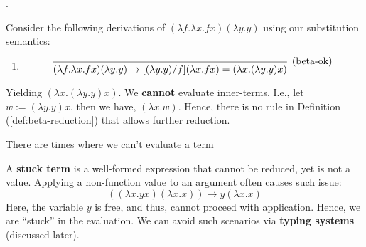     .
\begin{Example}

    \noindent
    Consider the following derivations of $(\lambda f. \lambda x. fx)(\lambda y. y)$ using our substitution semantics:

    \begin{enumerate}
        \item \[
        \begin{prooftree}
        \Infer0[(beta-ok)]{(\lambda f. \lambda x. fx)(\lambda y. y) \rightarrow [(\lambda y. y)/f](\lambda x. fx)=(\lambda x. (\lambda y. y)x)}
        \end{prooftree}
        \]
    \end{enumerate}
    \noindent
    Yielding $(\lambda x. (\lambda y. y)x)$. We \textbf{cannot} evaluate inner-terms. I.e., let $w:=(\lambda y.y)x$, then we have, $(\lambda x.w)$. Hence,
    there is no rule in Definition (\ref{def:beta-reduction}) that allows further reduction.
\end{Example}

\newpage

\noindent
There are times where we can't evaluate a term
\begin{Def}

    A \textbf{stuck term} is a well-formed expression that cannot be reduced, yet is not a value. Applying a non-function value to an argument often causes such issue:
    \Large
    \[
    ((\lambda x. yx)(\lambda x. x)) \rightarrow y(\lambda x. x)
    \]
    \normalsize
    Here, the variable \(y\) is free, and thus, cannot proceed with application. Hence, we are ``stuck'' in the evaluation.
    We can avoid such scenarios via \textbf{typing systems} (discussed later).
    
\end{Def}

